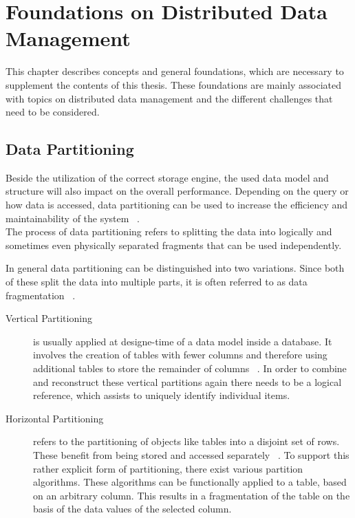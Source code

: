 \chapter{Foundations on Distributed Data Management}
\label{c:Foundation}

This chapter describes concepts and general foundations, which are necessary to supplement 
the contents of this thesis. These foundations are mainly associated with topics on distributed data management
and the different challenges that need to be considered.




\section{Data Partitioning}
\label{sec:part}

Beside the utilization of the correct storage engine, the used data model and structure 
will also impact on the overall performance. Depending on the query or 
how data is accessed, data partitioning can be used to increase the efficiency and 
maintainability of the system ~\cite{Agrawal_2004}.\\
The process of data partitioning refers to splitting the data into logically and sometimes even
physically separated fragments that can be used independently.

In general data partitioning can be distinguished into two variations.
Since both of these split the data into multiple parts, it is often referred to as data fragmentation ~\cite{tamer:2005}. 

\begin{description}
    \item [Vertical Partitioning] is usually applied at designe-time of a data model inside a 
    database. It involves the creation of tables with fewer columns and therefore using additional 
    tables to store the remainder of columns ~\cite{vertical_1984, normalization_2012}.
    In order to combine and reconstruct these vertical partitions again there needs to be a logical reference,
    which assists to uniquely identify individual items. 
    \item [Horizontal Partitioning] refers to the partitioning of objects like tables 
    into a disjoint set of rows. These benefit from being stored and accessed separately ~\cite{horizontal_1982}.
    To support this rather explicit form of partitioning, there exist various partition algorithms.
    These algorithms can be functionally applied to a table, based on an arbitrary column. 
    This results in a fragmentation of the table on the basis of the data values of the selected column.
\end{description}

